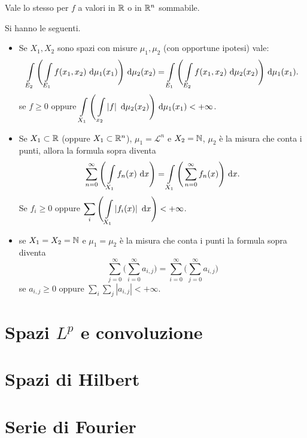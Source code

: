 \documentclass[a4paper, 11pt]{report}
\begin{document}
%
Vale lo stesso per $f$ a valori in $\mathbb R$ o in $\mathbb R^n$ sommabile.
%
\begin{osservazione}
Si hanno le seguenti.
\begin{itemize}[label={--}]
	\item Se $X_1, X_2$ sono spazi con misure $\mu_1,\mu_2$ (con opportune ipotesi) vale:
	\[
		\int\limits_{\mathclap{E_2}}^{} \Bigg( \int\limits_{\mathclap{E_1}}^{} f(x_1,x_2) \, \dd \mu_1(x_1)  \Bigg) \, \dd \mu_2(x_2) = \int\limits_{\mathclap{E_1}}^{} \Bigg( \int\limits_{\mathclap{E_2}}^{} f(x_1,x_2) \, \dd \mu_2(x_2)  \Bigg) \, \dd \mu_1(x_1).
	\] 
	se $f\geq 0$ oppure $\displaystyle \int\limits_{\mathclap{X_1}}^{} \Bigg( \int\limits_{\mathclap{x_2}}^{} \left| f \right| \, \dd \mu_2(x_2)  \Bigg) \, \dd \mu_1(x_1) < + \infty $.
	\item Se $X_1 \subset \mathbb R$ (oppure $X_1 \subset \mathbb R^n$), $\mu_1 = \mathcal{L}^n$ e $X_2 = \mathbb N$, $\mu_2$ è la misura che conta i punti, allora la formula sopra diventa
	\[
		\sum_{n=0}^{\infty} \Bigg( \int\limits_{\mathclap{X_1}}^{} f_n(x) \, \dd x  \Bigg) = \int\limits_{\mathclap{X_1}}^{} \Bigg( \sum_{n=0}^{\infty} f_n(x)  \Bigg) \, \dd x.
	\] 
	Se $f_i \geq 0$ oppure $\displaystyle \sum_{i} \Bigg( \int\limits_{\mathclap{X_1}}^{} \left| f_i(x) \right| \, \dd x  \Bigg) < + \infty $.
	\item se $X_1 = X_2 = \mathbb N$ e $\mu_1 = \mu_2$ è la misura che conta i punti la formula sopra diventa
	\[
		\sum_{j=0}^{\infty} \Bigg( \sum_{i=0}^{\infty} a_{i,j}  \Bigg) = \sum_{i=0}^{\infty} \Bigg( \sum_{j=0}^{\infty} a_{i,j}  \Bigg)
	\] 
	se $a_{i,j} \geq 0$ oppure $\sum_{i} \sum_{j} \left| a_{i,j} \right| < +\infty $.
\end{itemize}
\end{osservazione}
%






\chapter{Spazi $L^p$ e convoluzione}


\chapter{Spazi di Hilbert}


\chapter{Serie di Fourier}
\end{document}
